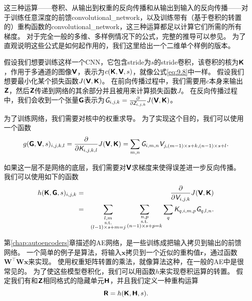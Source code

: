 这三种运算——卷积、从输出到权重的反向传播和从输出到输入的反向传播——对于训练任意深度的前馈\gls{convolutional_network}，以及训练带有（基于卷积的转置的）重构函数的\gls{convolutional_network}，这三种运算都足以计算它们所需的所有梯度。
对于完全一般的多维、多样例情况下的公式，完整的推导可以参见\cite{Goodfellow-TR2010}。 
为了直观说明这些公式是如何起作用的，我们这里给出一个二维单个样例的版本。
 
 
假设我们想要训练这样一个\gls{CNN}，它包含\gls{stride}为$s$的\gls{stride}卷积，该卷积的核为$\textsf{\textbf{K}}$，作用于多通道的图像$\textsf{\textbf{V}}$，表示为$c(\textsf{\textbf{K}}, \textsf{\textbf{V}}, s)$，就像公式\ref{eq:9.8}中一样。
假设我们想要最小化某个损失函数$J(\textsf{\textbf{V}}, \textsf{\textbf{K}})$。
在前向传播过程中，我们需要用$c$本身来输出$\textsf{\textbf{Z}}$，然后$\textsf{\textbf{Z}}$传递到网络的其余部分并且被用来计算损失函数$J$。
在反向传播过程中，我们会收到一个张量$\textsf{\textbf{G}}$表示为$\textit{\textsf{G}}_{i, j, k} = \frac{\partial}{\partial \textit{\textsf{Z}}_{i, j, k}} J(\textsf{\textbf{V}}, \textsf{\textbf{K}})$。

为了训练网络，我们需要对核中的权重求导。
为了实现这个目的，我们可以使用一个函数
\begin{equation}
g(\textsf{\textbf{G}}, \textsf{\textbf{V}}, s)_{i, j, k, l} = \frac{\partial}{\partial \textit{\textsf{K}}_{i, j, k, l}} J(\textsf{\textbf{V}}, \textsf{\textbf{K}}) = \sum_{m, n} \textit{\textsf{G}}_{i, m, n} \textit{\textsf{V}}_{j, (m-1)\times s+k, (n-1)\times s+l}.
\end{equation}

如果这一层不是网络的底层，我们需要对$\textsf{\textbf{V}}$求梯度来使得误差进一步反向传播。
我们可以使用如下的函数
\begin{eqnarray}
h(\textsf{\textbf{K}}, \textsf{\textbf{G}}, s)_{i, j, k} &=& \frac{\partial }{\partial \textit{\textsf{V}}_{i, j, k}} J(\textsf{\textbf{V}}, \textsf{\textbf{K}})\\
&=& \sum_{\substack{l, m\\
                  \text{s.t.}\\
                  (l-1)\times s+m = j}} \sum_{\substack{n, p\\
                                                            \text{s.t.}\\
                                                            (n-1)\times s +p = k}}
            \sum_q \textit{\textsf{K}}_{q,i,m,p} \textit{\textsf{G}}_{q, l, n}.
\end{eqnarray}

第\ref{chap:autoencoders}章描述的\gls{AE}网络，是一些训练成把输入拷贝到输出的前馈网络。
一个简单的例子是算法，将输入$\bm{x}$拷贝到一个近似的重构值$\bm{r}$，通过函数$\bm{W}^\top \bm{Wx}$来实现。
使用权重矩阵转置的乘法，就像算法这种，在一般的\gls{AE}中是很常见的。
为了使这些模型卷积化，我们可以用函数$h$来实现卷积运算的转置。
假定我们有和$\textsf{\textbf{Z}}$相同格式的隐藏单元$\textsf{\textbf{H}}$，并且我们定义一种重构运算
\begin{equation}
\textsf{\textbf{R}} = h(\textsf{\textbf{K}}, \textsf{\textbf{H}}, s).
\end{equation}

